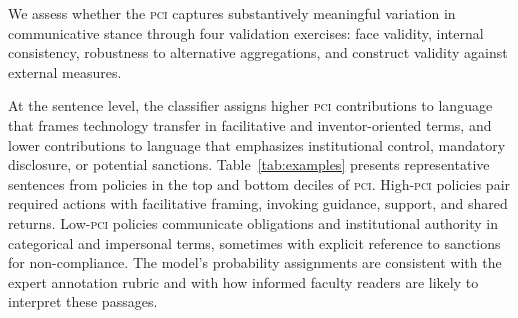 \documentclass[12pt]{article}
\newcommand{\PCI}{\textsc{pci}}
\begin{document}
We assess whether the \PCI{} captures substantively meaningful variation in
communicative stance through four validation exercises: face validity, internal
consistency, robustness to alternative aggregations, and construct validity against
external measures.

At the sentence level, the classifier assigns higher \PCI{} contributions to language
that frames technology transfer in facilitative and inventor-oriented terms, and lower
contributions to language that emphasizes institutional control, mandatory disclosure,
or potential sanctions.  Table~\ref{tab:examples} presents representative sentences
from policies in the top and bottom deciles of \PCI.  High-\PCI{} policies pair
required actions with facilitative framing, invoking guidance, support, and shared
returns.  Low-\PCI{} policies communicate obligations and institutional authority in
categorical and impersonal terms, sometimes with explicit reference to sanctions for
non-compliance.  The model's probability assignments are consistent with the expert
annotation rubric and with how informed faculty readers are likely to interpret these
passages.
\end{document}
